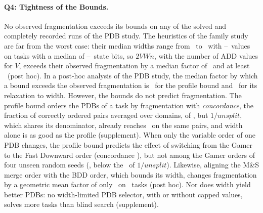 \documentclass[letterpaper]{article}
\newcommand{\values}{\ensuremath{V}}
\newcommand{\unioneffort}{\ensuremath{\mathit{unsplit}}}
\newcommand{\num}[1]{\numprint{#1}}
\theoremstyle{plain}
\theoremstyle{definition}
\theoremstyle{remark}
\begin{document}
\paragraph{Q4: Tightness of the Bounds.}
No observed fragmentation exceeds its bounds on any of the \num{\SlackObservations} solved and completely recorded runs of the PDB study.
The heuristics of the family study are far from the worst case: their median widths range from \WidthMedianMin\ to \WidthMedianMax\ with \ValuesMedianMin--\ValuesMedianMax\ values on tasks with a median of \BitsMedianMin--\BitsMedianMax\ state bits, so $2\values Wn$, with the number of ADD values for $\values$, exceeds their observed fragmentation by a median factor of \WidthSlackMedian\ and at least \WidthSlackMin\ (post hoc).
In a post-hoc analysis of the PDB study, the median factor by which a bound exceeds the observed fragmentation is \SlackProfileMedian\ for the profile bound and \SlackWidthMedian\ for its relaxation to width.
However, the bounds do not predict fragmentation.
The profile bound orders the PDBs of a task by fragmentation with \emph{concordance}, the fraction of correctly ordered pairs averaged over domains, of \HoldoutDenominatorProfileMacro, but $1/\unioneffort$, which shares its denominator, already reaches \HoldoutDenominatorNullMacro\ on the same pairs, and width alone is as good as the profile (supplement).
When only the variable order of one PDB changes, the profile bound predicts the effect of switching from the Gamer to the Fast Downward order (concordance \OrderProfileMacro), but not among the Gamer orders of four unseen random seeds (\SeedCartesianMacro, below the \SeedNullMacro\ of $1/\unioneffort$).
Likewise, aligning the M\&S merge order with the BDD order, which bounds its width, changes fragmentation by a geometric mean factor of only \PruneAlignedFragRatio\ on \PruneAlignedTasks\ tasks (post hoc).
Nor does width yield better PDBs: no width-limited PDB selector, with or without capped values, solves more tasks than blind search (supplement).
\end{document}
